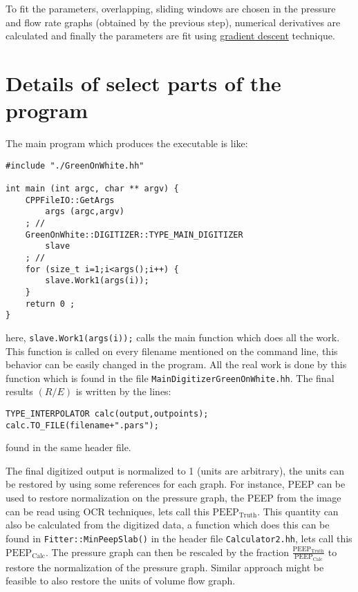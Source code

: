 	To fit the parameters, overlapping, sliding windows are chosen in the pressure and flow rate graphs (obtained by the previous step), numerical derivatives are calculated and finally the parameters are fit using \href{https://en.wikipedia.org/wiki/Gradient_descent}{gradient descent} technique.

\section{Details of select parts of the program}

The main program which produces the executable is like:
\begin{verbatim}
#include "./GreenOnWhite.hh"

int main (int argc, char ** argv) {
	CPPFileIO::GetArgs
		args (argc,argv)
	; //
	GreenOnWhite::DIGITIZER::TYPE_MAIN_DIGITIZER
		slave
	; //
	for (size_t i=1;i<args();i++) {
		slave.Work1(args(i));
	}
	return 0 ;
}
\end{verbatim}
here, {\tt{slave.Work1(args(i));}} calls the main function which does all the work. This function is called on every filename mentioned on the command line, this behavior can be easily changed in the program. All the real work is done by this function which is found in the file {\tt{MainDigitizerGreenOnWhite.hh}}.
The final results $\left( R/E \right)$ is written by the lines:
\begin{verbatim}
TYPE_INTERPOLATOR calc(output,outpoints);
calc.TO_FILE(filename+".pars");
\end{verbatim}
found in the same header file.

The final digitized output is normalized to 1 (units are arbitrary), the units can be restored by using some references for each graph.
For instance, PEEP can be used to restore normalization on the pressure graph, the PEEP from the image can be read using OCR techniques, lets call this $\text{PEEP}_{\text{Truth}}$.
This quantity can also be calculated from the digitized data, a function which does this can be found in {\tt{Fitter::MinPeepSlab()}} in the header file {\tt{Calculator2.hh}}, lets call this $\text{PEEP}_{\text{Calc}}$.
The pressure graph can then be rescaled by the fraction $\frac{\text{PEEP}_{\text{Truth}}}{\text{PEEP}_{\text{Calc}}}$ to restore the normalization of the pressure graph.
Similar approach might be feasible to also restore the units of volume flow graph.









